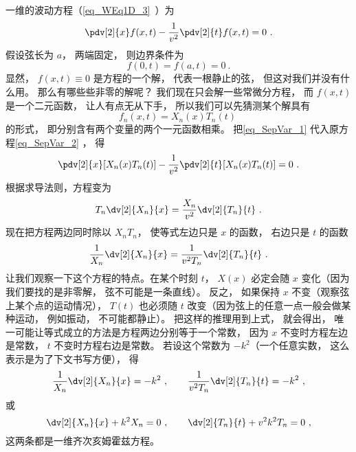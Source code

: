 一维的波动方程（\autoref{eq_WEq1D_3}~）为
\begin{equation}
\pdv[2]{x} f(x, t) - \frac{1}{v^2} \pdv[2]{t}f(x, t) = 0~.
\end{equation}
假设弦长为 $a$， 两端固定， 则边界条件为
\begin{equation}\label{eq_SepVar_3}
f(0, t) = f(a, t) = 0~.
\end{equation}
显然， $f(x, t) \equiv 0$ 是方程的一个解， 代表一根静止的弦， 但这对我们并没有什么用。 那么有哪些些非零的解呢？ 我们现在只会解一些常微分方程， 而 $f(x, t)$ 是一个二元函数， 让人有点无从下手， 所以我们可以先猜测某个解具有
\begin{equation}\label{eq_SepVar_1}
f_n(x, t) = X_n(x) T_n(t)~
\end{equation}
的形式， 即分别含有两个变量的两个一元函数相乘。 把\autoref{eq_SepVar_1} 代入原方程\autoref{eq_SepVar_2} ， 得
\begin{equation}
\pdv[2]{x}[X_n(x)T_n(t)] - \frac{1}{v^2}\pdv[2]{t} [X_n(x) T_n(t)] = 0~.
\end{equation}
根据求导法则，方程变为
\begin{equation}
T_n\dv[2]{X_n}{x} = \frac{X_n}{v^2} \dv[2]{T_n}{t}~.
\end{equation}
现在把方程两边同时除以 $X_nT_n$， 使等式左边只是 $x$ 的函数， 右边只是 $t$ 的函数
\begin{equation}
\frac{1}{X_n}\dv[2]{X_n}{x} = \frac{1}{v^2 T_n} \dv[2]{T_n}{t}~.
\end{equation}
让我们观察一下这个方程的特点。在某个时刻 $t$， $X(x)$ 必定会随 $x$ 变化（因为我们要找的是非零解， 弦不可能是一条直线）。 反之， 如果保持 $x$ 不变（观察弦上某个点的运动情况）， $T(t)$ 也必须随 $t$ 改变（因为弦上的任意一点一般会做某种运动， 例如振动， 不可能都静止）。 把这样的推理用到上式， 就会得出， 唯一可能让等式成立的方法是方程两边分别等于一个常数， 因为 $x$ 不变时方程左边是常数，  $t$ 不变时方程右边是常数。 若设这个常数为 $-k^2$（一个任意实数， 这么表示是为了下文书写方便）， 得
\begin{equation}
\frac{1}{X_n}\dv[2]{X_n}{x} = -k^2~,
\qquad
\frac{1}{v^2 T_n}\dv[2]{T_n}{t} = -k^2~,
\end{equation}
或
\begin{equation}
\dv[2]{X_n}{x} + k^2 X_n = 0~,
\qquad
\dv[2]{T_n}{t} + v^2k^2 T_n = 0~,
\end{equation}
这两条都是一维齐次亥姆霍兹方程。

